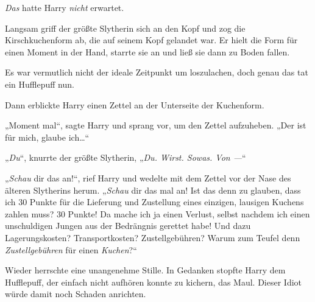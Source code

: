 \emph{Das} hatte Harry \emph{nicht} erwartet.

Langsam griff der größte Slytherin sich an den Kopf und zog die Kirschkuchenform ab, die auf seinem Kopf gelandet war. Er hielt die Form für einen Moment in der Hand, starrte sie an und ließ sie dann zu Boden fallen.

Es war vermutlich nicht der ideale Zeitpunkt um loszulachen, doch genau das tat ein Hufflepuff nun.

Dann erblickte Harry einen Zettel an der Unterseite der Kuchenform.

„Moment mal“, sagte Harry und sprang vor, um den Zettel aufzuheben. „Der ist für mich, glaube ich…“

„\emph{Du}“, knurrte der größte Slytherin, „\emph{Du. Wirst. Sowas. Von —}“

„\emph{Schau} dir das an!“, rief Harry und wedelte mit dem Zettel vor der Nase des älteren Slytherins herum. „\emph{Schau} dir das mal an! Ist das denn zu glauben, dass ich 30 Punkte für die Lieferung und Zustellung eines einzigen, lausigen Kuchens zahlen muss? 30 Punkte! Da mache ich ja einen Verlust, selbst nachdem ich einen unschuldigen Jungen aus der Bedrängnis gerettet habe! Und dazu Lagerungskosten? Transportkosten? Zustellgebühren? Warum zum Teufel denn \emph{Zustellgebühren} für einen \emph{Kuchen}?“

Wieder herrschte eine unangenehme Stille. In Gedanken stopfte Harry dem Hufflepuff, der einfach nicht aufhören konnte zu kichern, das Maul. Dieser Idiot würde damit noch Schaden anrichten.

